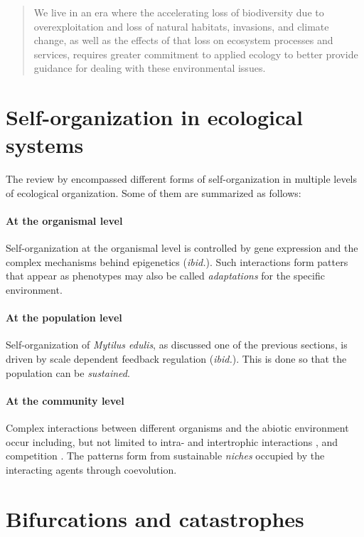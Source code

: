 \begin{quote}
We live in an era where the accelerating loss of biodiversity due to overexploitation and loss of natural habitats, invasions, and climate change, as well as the effects of that loss on ecosystem processes and services, requires greater commitment to applied ecology to better provide guidance for dealing with these environmental issues.
\end{quote}

\section{Self-organization in ecological systems}

The review by  encompassed different forms of self-organization in multiple levels of ecological organization.
Some of them are summarized as follows:

\paragraph{At the organismal level}
Self-organization at the organismal level is controlled by gene expression and the complex mechanisms behind epigenetics (\textit{ibid.}).
Such interactions form patters that appear as phenotypes may also be called \emph{adaptations} for the specific environment.

\paragraph{At the population level}
Self-organization of \textit{Mytilus edulis}, as discussed one of the previous sections, is driven by scale dependent feedback regulation (\textit{ibid.}).
This is done so that the population can be \emph{sustained}.

\paragraph{At the community level}
Complex interactions between different organisms and the abiotic environment occur including, but not limited to intra- and intertrophic interactions \cite{Seibold2018}, and competition \cite{Dong2019}.
The patterns form from sustainable \emph{niches} occupied by the interacting agents through coevolution.

\section{Bifurcations and catastrophes}

